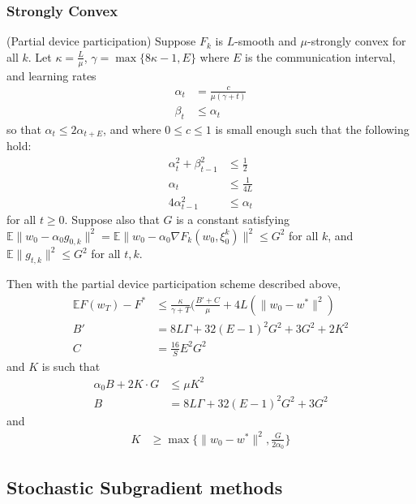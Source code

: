 \subsubsection{Strongly Convex}
\begin{theorem}
	(Partial device participation) Suppose $F_{k}$ is $L$-smooth and
	$\mu$-strongly convex for all $k$. Let $\kappa=\frac{L}{\mu}$,
	$\gamma=\max\{8\kappa-1,E\}$ where $E$ is the communication interval,
	and learning rates 
	\begin{align*}
	\alpha_{t} & =\frac{c}{\mu(\gamma+t)}\\
	\beta_{t} & \leq\alpha_{t}
	\end{align*}
	so that $\alpha_{t}\leq2\alpha_{t+E}$, and where $0\leq c\leq1$
	is small enough such that the following hold: 
	\begin{align*}
	\alpha_{t}^{2}+\beta_{t-1}^{2} & \leq\frac{1}{2}\\
	\alpha_{t} & \leq\frac{1}{4L}\\
	4\alpha_{t-1}^{2} & \leq\alpha_{t}
	\end{align*}
	for all $t\geq0$. Suppose also that $G$ is a constant satisfying
	$\mathbb{E}\|w_{0}-\alpha_{0}g_{0,k}\|^{2}=\mathbb{E}\|w_{0}-\alpha_{0}\nabla F_{k}(w_{0},\xi_{0}^{k})\|^{2}\leq G^{2}$
	for all $k$, and $\mathbb{E}\|g_{t,k}\|^{2}\leq G^{2}$ for all $t,k$. 
	
	Then with the partial device participation scheme described above,
	\begin{align*}
	\mathbb{E}F(w_{T})-F^{\ast} & \leq\frac{\kappa}{\gamma+T}(\frac{B'+C}{\mu}+4L(\|w_{0}-w^{\ast}\|^{2})\\
	B' & =8L\Gamma+32(E-1)^{2}G^{2}+3G^{2}+2K^{2}\\
	C & =\frac{16}{S}E^{2}G^{2}
	\end{align*}
	and $K$ is such that 
	\begin{align*}
	\alpha_{0}B+2K\cdot G & \leq\mu K^{2}\\
	B & =8L\Gamma+32(E-1)^{2}G^{2}+3G^{2}
	\end{align*}
	and
	\begin{align*}
	K & \geq\max\{\|w_{0}-w^{\ast}\|^{2},\frac{G}{2\alpha_{0}}\}
	\end{align*}
\end{theorem}

\subsection{Stochastic Subgradient methods}

